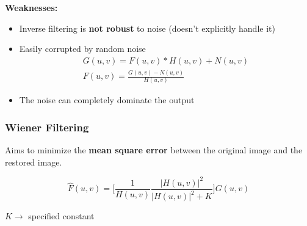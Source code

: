 \textbf{Weaknesses:}

\begin{itemize}
  \item Inverse filtering is \textbf{not robust} to noise (doesn't
    explicitly handle it)
  \item Easily corrupted by random noise
    \begin{gather*}
      G(u, v) = F(u, v) * H(u, v) + N(u, v) \\
      F(u, v) = \frac{G(u, v) - N(u, v)}{H(u, v)}
    \end{gather*}
  \item The noise can completely dominate the output
\end{itemize}

\subsubsection*{Wiener Filtering}

Aims to minimize the \textbf{mean square error} between the original
image and the restored image.

\begin{equation*}
  \hat{F}(u, v) = \bigg[ \frac{1}{H(u, v)} \frac{|H(u, v)|^2}{|H(u,
  v)|^2 + K} \bigg] G(u, v)
\end{equation*}

$K \rightarrow$ specified constant

